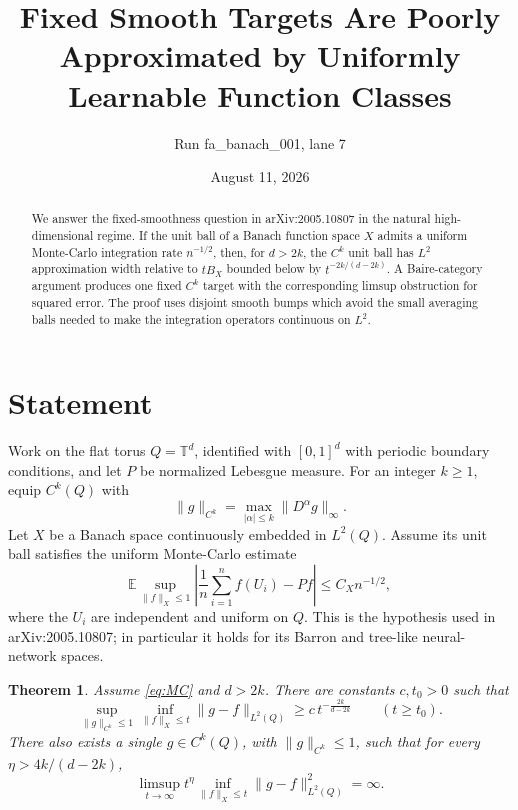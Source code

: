 \documentclass[11pt]{article}
\title{Fixed Smooth Targets Are Poorly Approximated by Uniformly Learnable Function Classes}
\author{Run fa\_banach\_001, lane 7}
\date{August 11, 2026}
\newtheorem{theorem}{Theorem}
\newcommand{\T}{\mathbb T}
\newcommand{\E}{\mathbb E}
\begin{document}
\maketitle

\begin{abstract}
We answer the fixed-smoothness question in arXiv:2005.10807 in the natural
high-dimensional regime.  If the unit ball of a Banach function space $X$
admits a uniform Monte-Carlo integration rate $n^{-1/2}$, then, for $d>2k$,
the $C^k$ unit ball has $L^2$ approximation width relative to $tB_X$ bounded
below by $t^{-2k/(d-2k)}$.  A Baire-category argument produces one fixed
$C^k$ target with the corresponding limsup obstruction for squared error.
The proof uses disjoint smooth bumps which avoid the small averaging balls
needed to make the integration operators continuous on $L^2$.
\end{abstract}

\section{Statement}

Work on the flat torus $Q=\T^d$, identified with $[0,1]^d$ with periodic
boundary conditions, and let $P$ be normalized Lebesgue measure.  For an
integer $k\ge1$, equip $C^k(Q)$ with
\[
  \|g\|_{C^k}=\max_{|\alpha|\le k}\|D^\alpha g\|_\infty.
\]
Let $X$ be a Banach space continuously embedded in $L^2(Q)$.  Assume its unit
ball satisfies the uniform Monte-Carlo estimate
\begin{equation}\label{eq:MC}
 \E\sup_{\|f\|_X\le1}
 \left|\frac1n\sum_{i=1}^n f(U_i)-Pf\right|
 \le C_Xn^{-1/2},
\end{equation}
where the $U_i$ are independent and uniform on $Q$.  This is the hypothesis
used in arXiv:2005.10807; in particular it holds for its Barron and tree-like
neural-network spaces.

\begin{theorem}\label{thm:main}
Assume \eqref{eq:MC} and $d>2k$.  There are constants $c,t_0>0$ such that
\begin{equation}\label{eq:width}
 \sup_{\|g\|_{C^k}\le1}\inf_{\|f\|_X\le t}\|g-f\|_{L^2(Q)}
 \ge c\,t^{-\frac{2k}{d-2k}}
 \qquad(t\ge t_0).
\end{equation}
There also exists a single $g\in C^k(Q)$, with $\|g\|_{C^k}\le1$, such that
for every $\eta>4k/(d-2k)$,
\begin{equation}\label{eq:fixed}
 \limsup_{t\to\infty}t^\eta
 \inf_{\|f\|_X\le t}\|g-f\|_{L^2(Q)}^2=\infty.
\end{equation}
\end{theorem}
\end{document}
